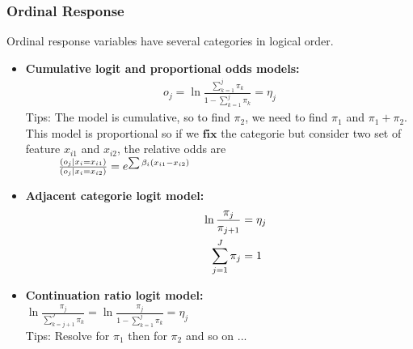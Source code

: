 \documentclass[10pt, french]{article}
\begin{document}
\begin{multicols*}{3}
\subsubsection*{Ordinal Response}
Ordinal response variables have several categories in logical order.
\begin{itemize}[align=left,leftmargin=*]
  \item \textbf{Cumulative logit and proportional odds models:}
  \begin{align*}
    o_j = \ln \frac{\sum_{k=1}^j \pi_k}{1-\sum_{k=1}^j \pi_k} = \eta_j
  \end{align*}
  Tips: The model is cumulative, so to find $\pi_{2}$, we need to find $\pi_{1}$ and $\pi_{1}+\pi_{2}$. \\
  This model is proportional so if we $\textbf{fix}$ the categorie but consider two set of feature $x_{i1}$ and $x_{i2}$, the relative odds are \\
  $\hspace*{1cm} \frac{(o_j|x_i=x_{i1})}{(o_j|x_i=x_{i2})} = e^{\sum \beta_i (x_{i1} - x_{i2})}$
  \item \textbf{Adjacent categorie logit model:}  \\
  \begin{align*}
    \hspace*{1cm}
    \ln \frac{\pi_j}{\pi_{j+1}} &= \eta_j \\
    \sum_{j=1}^J \pi_j &= 1
  \end{align*}
  \item \textbf{Continuation ratio logit model:} \\
  \hspace*{0.5cm}
    $\ln \frac{\pi_j}{\sum_{k=j+1}^J \pi_k} = \ln \frac{\pi_j}{1 - \sum_{k=1}^j \pi_k} = \eta_j$ \\
    Tips: Resolve for $\pi_1$ then for $\pi_2$ and so on ...
\end{itemize}
\columnbreak


\end{multicols*}
\end{document}
